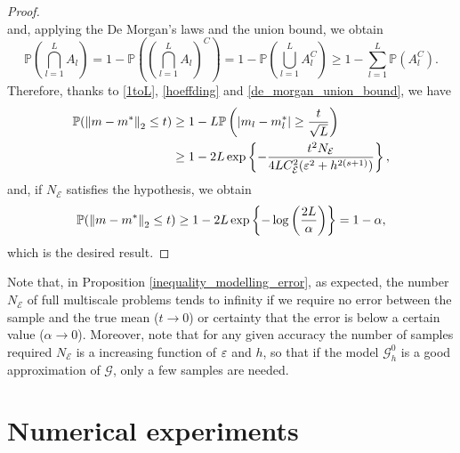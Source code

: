 \documentclass[10pt]{article}
\begin{document}
\begin{proof}
\begin{equation*}
\end{equation*}
and, applying the De Morgan's laws and the union bound, we obtain
\begin{equation}
\label{de_morgan_union_bound}
\mathbb{P}\left ( \bigcap_{l=1}^L A_l \right ) = 1 - \mathbb{P} \left ( \left ( \bigcap_{l=1}^L A_l \right )^C \right ) = 1 - \mathbb{P} \left ( \bigcup_{l=1}^L A_l^C \right ) \ge 1 - \sum_{l=1}^L \mathbb{P}(A_l^C).
\end{equation}
Therefore, thanks to \eqref{1toL}, \eqref{hoeffding} and \eqref{de_morgan_union_bound}, we have
\begin{align*}
\mathbb{P}( \left\|m - m^*\right\|_2 \le t ) \ge & \; 1 - L \mathbb{P} \left ( \left\lvert m_l - m^*_l\right\rvert \ge \frac{t}{\sqrt{L}} \right ) \\
\ge & \; 1 - 2L \exp \left \{ - \frac{t^2 N_{\mathcal{E}}}{4 L C_{\mathcal{E}}^2 (\varepsilon^2 + h^{2(s+1)})} \right \},
\end{align*}
and, if $N_{\mathcal{E}}$ satisfies the hypothesis, we obtain
\begin{equation*}
\mathbb{P}( \left\|m - m^*\right\|_2 \le t ) \ge 1 - 2L \exp \left \{ - \log \left ( \frac{2L}{\alpha} \right ) \right \} = 1 - \alpha,
\end{equation*}
which is the desired result.
\end{proof}

\begin{remark}
Note that, in Proposition \ref{inequality_modelling_error}, as expected, the number $N_{\mathcal{E}}$ of full multiscale problems tends to infinity if we require no error between the sample and the true mean ($t \to 0$) or certainty that the error is below a certain value ($\alpha \to 0$). Moreover, note that for any given accuracy the number of samples required $N_{\mathcal E}$ is a increasing function of $\varepsilon$ and $h$, so that if the model $\mathcal G^0_h$ is a good approximation of $\mathcal G$, only a few samples are needed.
\end{remark}

\section{Numerical experiments}\label{Experiments}
\end{document}

